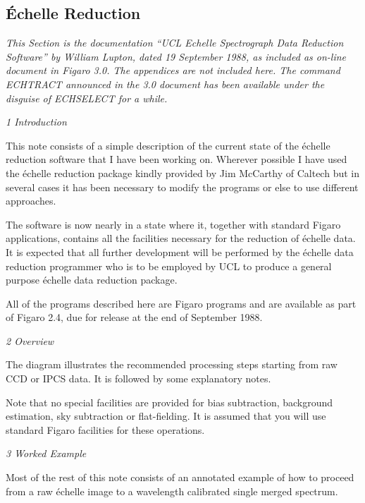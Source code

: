 \subsection{\'Echelle Reduction}

{\it This Section is the documentation ``UCL Echelle Spectrograph Data
Reduction Software'' by William Lupton, dated 19 September 1988, as included as
on-line document in Figaro 3.0. The appendices are not included here. The
command ECHTRACT announced in the 3.0 document has been available under the
disguise of ECHSELECT for a while.}


\goodbreak
\vspace{12pt}
{\it 1 Introduction}

This note consists of a simple description of the current state of the
\'echelle reduction software that I have been working on. Wherever
possible I have used the \'echelle reduction package kindly provided by
Jim McCarthy of Caltech but in several cases it has been necessary to
modify the programs or else to use different approaches.

The software is now nearly in a state where it, together with standard Figaro
applications, contains all the facilities necessary for the reduction of
\'echelle data. It is expected that all further development will be performed
by the \'echelle data reduction programmer who is to be employed by UCL to
produce a general purpose \'echelle data reduction package.

All of the programs described here are Figaro programs and are available
as part of Figaro 2.4, due for release at the end of September 1988.


\goodbreak
\vspace{12pt}
{\it 2 Overview}

The diagram illustrates the recommended processing steps starting
from raw CCD or IPCS data. It is followed by some explanatory notes.


Note that no special facilities are provided for bias subtraction, background
estimation, sky subtraction or flat-fielding. It is assumed that you will use
standard Figaro facilities for these operations.


\goodbreak
\vspace{12pt}
{\it 3 Worked Example}

Most of the rest of this note consists of an annotated example of how to
proceed from a raw \'echelle image to a wavelength calibrated single merged
spectrum.

